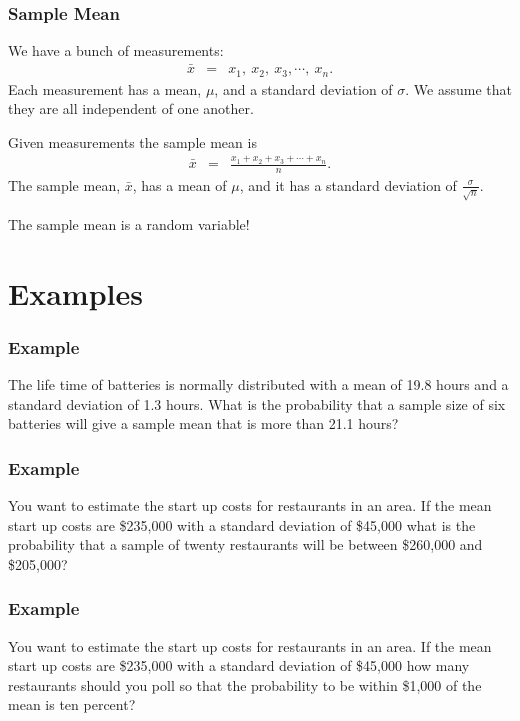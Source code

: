 \begin{frame}
  \frametitle{Sample Mean}

  We have a bunch of measurements:
  \begin{eqnarray*}
    \bar{x} & = & x_1,~x_2,~x_3,\cdots,~x_n.
  \end{eqnarray*}
  Each measurement has a mean, $\mu$, and a standard deviation of
  $\sigma$. We assume that they are all independent of one another.
  
    \begin{definition}
      Given measurements the sample mean is 
      \begin{eqnarray*}
        \bar{x} & = & \frac{x_1+x_2+x_3+\cdots+x_n}{n}.
      \end{eqnarray*}
      The sample mean, $\bar{x}$,  has a mean of $\mu$, and it has a
      standard deviation of $\frac{\sigma}{\sqrt{n}}$.
    \end{definition}

    The sample mean is a random variable!

\end{frame}


\section{Examples}

\begin{frame}
  \frametitle{Example}

  The life time of batteries is normally distributed with a mean of
  19.8 hours and a standard deviation of 1.3 hours. What is the
  probability that a sample size of six batteries will give a sample
  mean that is more than 21.1 hours?

\end{frame}


\begin{frame}
  \frametitle{Example}

  You want to estimate the start up costs for restaurants in an
  area. If the mean start up costs are \$235,000 with a standard
  deviation of \$45,000 what is the probability that a sample of
  twenty restaurants will be between \$260,000 and \$205,000?

\end{frame}


\begin{frame}
  \frametitle{Example}

  You want to estimate the start up costs for restaurants in an
  area. If the mean start up costs are \$235,000 with a standard
  deviation of \$45,000 how many restaurants should you poll so that
  the probability to be within \$1,000 of the mean is ten percent?

\end{frame}


